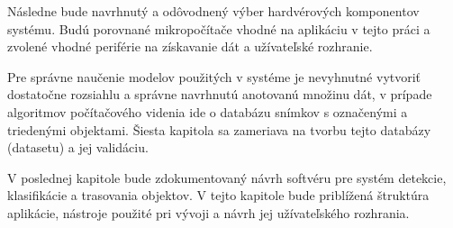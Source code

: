 Následne bude navrhnutý a odôvodnený výber hardvérových komponentov systému. Budú porovnané mikropočítače vhodné na aplikáciu v tejto práci a zvolené vhodné periférie na získavanie dát a užívateľské rozhranie.

Pre správne naučenie modelov použitých v systéme je nevyhnutné vytvoriť dostatočne rozsiahlu a správne navrhnutú anotovanú množinu dát, v prípade algoritmov počítačového videnia ide o databázu snímkov s označenými a triedenými objektami. Šiesta kapitola sa zameriava na tvorbu tejto databázy (datasetu) a jej validáciu.

V poslednej kapitole bude zdokumentovaný návrh softvéru pre systém detekcie, klasifikácie a trasovania objektov. V tejto kapitole bude priblížená štruktúra aplikácie, nástroje použité pri vývoji a návrh jej užívateľského rozhrania.

% 
% 
% 
